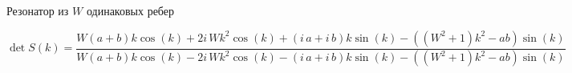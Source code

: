\documentclass{beamer}
\newcommand{\eexp}[1]{e^{#1}}
\renewcommand{\Im}{\operatorname{Im}}
\begin{document}



\begin{frame}{Резонатор из $W$ одинаковых ребер}

\begin{figure}
\begin{tikzpicture}[scale=0.5]

\end{tikzpicture}
\end{figure}

{
\scriptsize
\[
\det S(k) = \frac{W {\left(a + b\right)} k \cos\left(k\right) + 2 i \, W k^{2} \cos\left(k\right) + {\left(i \, a + i \, b\right)} k \sin\left(k\right) - {\left({\left(W^{2} + 1\right)} k^{2} - a b\right)} \sin\left(k\right)}{W {\left(a + b\right)} k \cos\left(k\right) - 2 i \, W k^{2} \cos\left(k\right) - {\left(i \, a + i \, b\right)} k \sin\left(k\right) - {\left({\left(W^{2} + 1\right)} k^{2} - a b\right)} \sin\left(k\right)}
\]
}

\end{frame}





\end{document}
